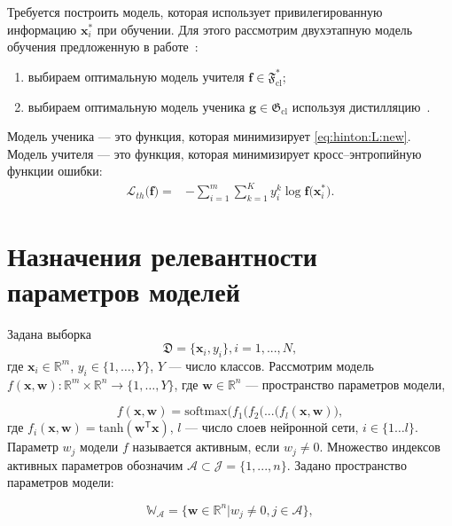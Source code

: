 Требуется построить модель, которая использует привилегированную информацию $\mathbf{x}^*_i$ при обучении. Для этого рассмотрим двухэтапную модель обучения предложенную в работе~\cite{Lopez2016}:
\begin{enumerate}
    \item выбираем оптимальную модель учителя $\mathbf{f} \in \mathfrak{F}_{\text{cl}}^*$;
    \item выбираем оптимальную модель ученика $\mathbf{g} \in \mathfrak{G}_{\text{cl}}$ используя дистилляцию~\cite{Hinton2015}. 
\end{enumerate}

Модель ученика --- это функция, которая минимизирует \eqref{eq:hinton:L:new}. Модель учителя --- это функция, которая минимизирует кросс--энтропийную функции ошибки:
\[
\label{eq:hinton.2}
\begin{aligned}
   \mathcal{L}_{th}\bigr(\mathbf{f}\bigr) = &-\sum_{i=1}^{m}{{\sum_{k=1}^{K}y^k_i\log\mathbf{f}\bigr(\mathbf{x}^*_i\bigr)}}.
   \end{aligned}
\]

\section{Назначения релевантности параметров моделей}

Задана выборка
\[
\label{2.1}
\mathfrak{D} = \{\textbf{x}_i,y_i\},  i =1,...,N,
\]
где $\textbf{x}_i \in \mathbb{R}^{m}$, $y_i \in \{1, \dots, Y\}$, $Y$ --- число классов.
Рассмотрим модель $f(\mathbf{x}, \mathbf{w}): \mathbb{R}^m \times \mathbb{R}^n \to \{1,\dots,Y\}$, где $\textbf{w} \in \mathbb{R}^n$ --- пространство параметров модели,

\[
\label{2.2}
f(\mathbf{x}, \mathbf{w}) = \text{softmax}\bigl( f_1(f_2(...(f_l(\mathbf{x}, \mathbf{w})\bigr),
\]
где $f_i(\mathbf{x}, \mathbf{w}) =  \text{tanh}(\mathbf{w}^\mathsf{T}\mathbf{x})$, $l$ --- число слоев нейронной сети, $i \in \{1\dots l\}$.
Параметр $w_j$ модели $f$  называется активным, если $w_j \not = 0$. Множество индексов активных параметров обозначим $\mathcal{A} \subset \mathcal{J} = \{1,...,n\}$.
Задано пространство параметров модели:

\[
\label{2.3}
\mathbb{W_\mathcal{A}} = \{ \textbf{w} \in \mathbb{R}^n | w_j\not=0, j \in \mathcal{A}  \},
\]


